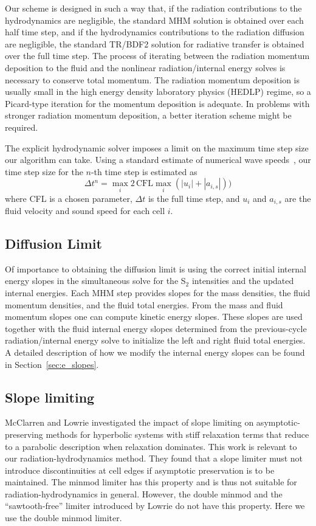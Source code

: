 \documentclass[preprint,12pt]{elsarticle}
\begin{document}
Our scheme is designed in such a way that, 
if the radiation contributions to the hydrodynamics are negligible, the standard MHM solution is obtained over each half time step, and if the hydrodynamics contributions to 
the radiation diffusion are negligible, the standard TR/BDF2 solution for radiative transfer is obtained over the full time step.  The process of iterating 
between the radiation momentum deposition to the fluid and the nonlinear radiation/internal energy solves is necessary to conserve total momentum.  
The radiation momentum deposition is usually small in the high energy density laboratory physics (HEDLP) regime, so a Picard-type iteration for the
momentum deposition is adequate.  In problems 
with stronger radiation momentum deposition, a better iteration scheme might be required. 

The explicit hydrodynamic solver imposes a limit on the maximum time step size our
algorithm can take.
Using a standard estimate of numerical wave speeds~\cite{toro}, our time step size for the $n$-th time
step is estimated as
\begin{equation}\label{eq:cfl}
    \Delta t^n = \max_{i} 2\,\text{CFL} \max_{i}\left(|u_i| + |a_{i,s}|\right))
\end{equation}
where CFL is a chosen parameter, $\Delta t$ is the full time step, and $u_i$ and $a_{i,s}$ are the fluid velocity
and sound speed for each cell $i$.


\subsection{Diffusion Limit}
\label{sec:diffusion-limit}
Of importance to obtaining the diffusion limit is using the correct initial internal energy slopes in the simultaneous solve for the 
S$_2$ intensities and the updated internal energies.  Each MHM step provides slopes for the mass densities, the fluid momentum densities, 
and the fluid total energies.  From the mass and fluid momentum slopes one can compute kinetic energy slopes.  These slopes are used 
together with the fluid internal energy slopes determined from the previous-cycle radiation/internal energy solve to initialize the left and right 
fluid total energies. A detailed description of how we modify the internal energy slopes can be found in Section~\ref{sec:e_slopes}.

\subsection{Slope limiting}
McClarren and Lowrie \cite{mclow2008} investigated the impact of slope limiting on asymptotic-preserving methods for hyperbolic systems with stiff 
relaxation terms that reduce to a parabolic description when relaxation dominates.  This work is relevant to our radiation-hydrodynamics method. 
They found that a slope limiter must not introduce discontinuities at cell edges if asymptotic preservation is to be maintained.  The minmod limiter 
has this property and is thus not suitable for radiation-hydrodynamics in general.  However, the double minmod and the ``sawtooth-free'' limiter 
introduced by Lowrie do not have this property.  Here we use the double minmod limiter.   
\end{document}
